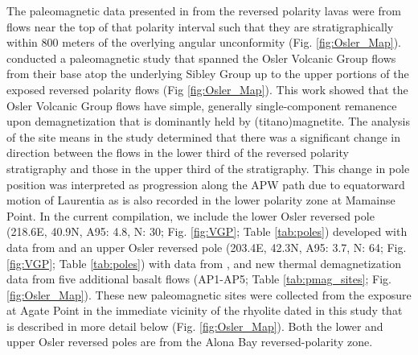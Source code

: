 \documentclass[11pt,letterpaper]{article}
\begin{document}
The paleomagnetic data presented in \cite{Halls1974a} from the reversed polarity lavas were from flows near the top of that polarity interval such that they are stratigraphically within 800 meters of the overlying angular unconformity (Fig. \ref{fig:Osler_Map}). \cite{Swanson-Hysell2014b} conducted a paleomagnetic study that spanned the Osler Volcanic Group flows from their base atop the underlying Sibley Group up to the upper portions of the exposed reversed polarity flows (Fig \ref{fig:Osler_Map}). This work showed that the Osler Volcanic Group flows have simple, generally single-component remanence upon demagnetization that is dominantly held by (titano)magnetite. The analysis of the site means in the study determined that there was a significant change in direction between the flows in the lower third of the reversed polarity stratigraphy and those in the upper third of the stratigraphy. This change in pole position was interpreted as progression along the APW path due to equatorward motion of Laurentia as is also recorded in the lower polarity zone at Mamainse Point. In the current compilation, we include the lower Osler reversed pole (218.6\textdegree E, 40.9\textdegree N, A95: 4.8\textdegree, N: 30; Fig. \ref{fig:VGP}; Table \ref{tab:poles}) developed with data from \cite{Swanson-Hysell2014b} and an upper Osler reversed pole (203.4\textdegree E, 42.3\textdegree N, A95: 3.7\textdegree, N: 64; Fig. \ref{fig:VGP}; Table \ref{tab:poles}) with data from \cite{Halls1974a}, \cite{Swanson-Hysell2014b} and new thermal demagnetization data from five additional basalt flows (AP1-AP5; Table \ref{tab:pmag_sites}; Fig. \ref{fig:Osler_Map}). These new paleomagnetic sites were collected from the exposure at Agate Point in the immediate vicinity of the rhyolite dated in this study that is described in more detail below (Fig. \ref{fig:Osler_Map}). Both the lower and upper Osler reversed poles are from the Alona Bay reversed-polarity zone.
\end{document}
